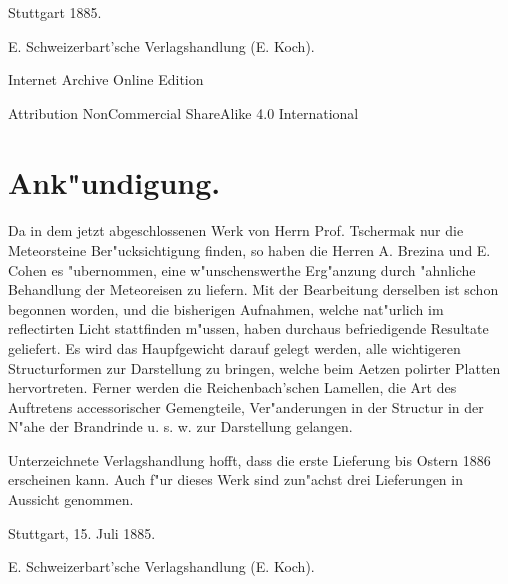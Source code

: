 \documentclass[a4paper, 11pt, oneside, polutonikogreek, german]{article}
\begin{document}
\begin{titlepage}
		
	\vspace*{\fill}%
	
	Stuttgart 1885. %
	
	{\small E. Schweizerbart'sche Verlagshandlung (E. Koch).} %

	\vspace{1\baselineskip} %

    Internet Archive Online Edition  %
	
	{\small Attribution NonCommercial ShareAlike 4.0 International } %
\end{titlepage}
\setlength{\parskip}{1mm plus1mm minus1mm}
\setcounter{tocdepth}{3}
\setcounter{secnumdepth}{3}
\pagestyle{fancy}
\fancyhf{}
\cfoot{\frakfamily{\thepage}}
\Large
\tableofcontents
\clearpage
\section{Ank"undigung.}
\paragraph*{}
Da in dem jetzt abgeschlossenen Werk von Herrn Prof. Tschermak nur die Meteorsteine Ber"ucksichtigung finden, so haben die Herren A. Brezina und E. Cohen es "ubernommen, eine w"unschenswerthe Erg"anzung durch "ahnliche Behandlung der Meteoreisen zu liefern. Mit der Bearbeitung derselben ist schon begonnen worden, und die bisherigen Aufnahmen, welche nat"urlich im reflectirten Licht stattfinden m"ussen, haben durchaus befriedigende Resultate geliefert. Es wird das Haupfgewicht darauf gelegt werden, alle wichtigeren Structurformen zur Darstellung zu bringen, welche beim Aetzen polirter Platten hervortreten. Ferner werden die Reichenbach'schen Lamellen, die Art des Auftretens accessorischer Gemengteile, Ver"anderungen in der Structur in der N"ahe der Brandrinde u. s. w. zur Darstellung gelangen.

Unterzeichnete Verlagshandlung hofft, dass die erste Lieferung bis Ostern 1886 erscheinen kann. Auch f"ur dieses Werk sind zun"achst drei Lieferungen in Aussicht genommen.

Stuttgart, 15. Juli 1885.

\bigskip

E. Schweizerbart'sche Verlagshandlung (E. Koch).
\clearpage
\end{document}
